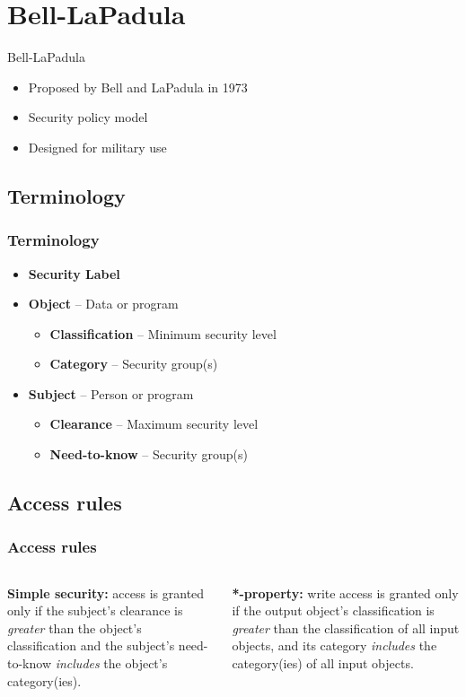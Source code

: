 \documentclass[10pt]{beamer}
\begin{document}

\section{Bell-LaPadula}

\begin{frame}{Bell-LaPadula}{}
	\begin{itemize}
		\item Proposed by Bell and LaPadula in 1973
		\item Security policy model
		\item Designed for military use
	\end{itemize}
\end{frame}

\subsection{Terminology}
\begin{frame}
	\frametitle{Terminology}
	
	\begin{itemize}
		\item \textbf{Security Label}
		\item \textbf{Object} -- Data or program
			\begin{itemize}
				\item \textbf{Classification} -- Minimum security level
				\item \textbf{Category} -- Security group(s)
			\end{itemize}
		\item \textbf{Subject} -- Person or program
			\begin{itemize}
				\item \textbf{Clearance} -- Maximum security level
				\item \textbf{Need-to-know} -- Security group(s)
			\end{itemize}
	\end{itemize}
\end{frame}

\subsection{Access rules}
\begin{frame}
	\frametitle{Access rules}
	
	\begin{columns}
		\begin{column}{.45\textwidth}
			\textbf{Simple security:} access is granted only if the subject's clearance is \textit{greater} than the object's classification and the subject's need-to-know \textit{includes} the object's category(ies).
		\end{column}
		\begin{column}{.45\textwidth}
			\textbf{*-property:} write access is granted only if the output object's classification is \textit{greater} than the classification of all input objects, and its category \textit{includes} the category(ies) of all input objects.
		\end{column}
	\end{columns}
\end{frame}
\end{document}

